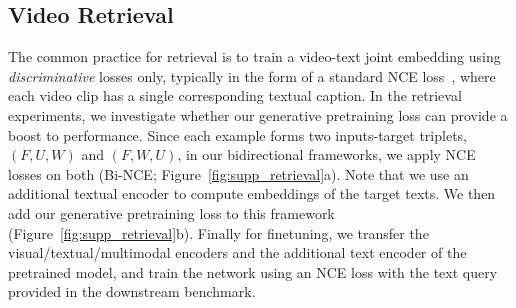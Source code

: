 \documentclass[10pt,twocolumn,letterpaper]{article}
\begin{document}

\subsection{Video Retrieval}

The common practice for retrieval is to train a video-text joint embedding using \textit{discriminative} losses only, typically in the form of a standard NCE loss~\cite{gutmann2010noise}, where each video clip has a single corresponding textual caption.
In the retrieval experiments, we investigate whether our generative pretraining loss can provide a boost to performance.
Since each example forms two inputs-target triplets, \ie $(F, U, W)$ and $(F, W, U)$, in our bidirectional frameworks, we apply NCE losses on both (Bi-NCE; Figure~\ref{fig:supp_retrieval}a). Note that we use an additional textual encoder to compute embeddings of the target texts. 
We then add our generative pretraining loss to this framework (Figure~\ref{fig:supp_retrieval}b).
Finally for finetuning, we transfer the visual/textual/multimodal encoders and the additional text encoder of the pretrained model, and train the network using an NCE loss with the text query provided in the downstream benchmark.
\end{document}
